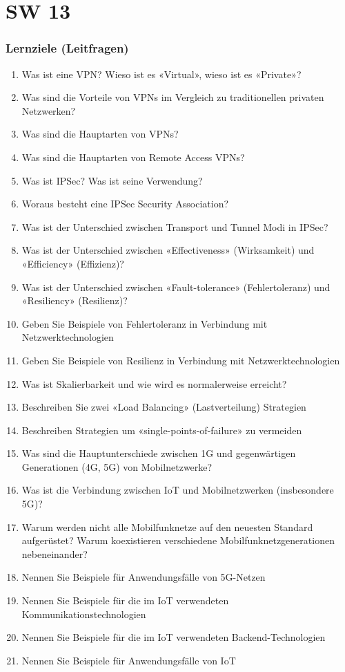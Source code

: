 \part{SW 13}
\section{Lernziele (Leitfragen)}
\begin{enumerate}
    \item Was ist eine VPN? Wieso ist es «Virtual», wieso ist es «Private»?
    \item Was sind die Vorteile von VPNs im Vergleich zu traditionellen privaten Netzwerken?
    \item Was sind die Hauptarten von VPNs?
    \item Was sind die Hauptarten von Remote Access VPNs?
    \item Was ist IPSec? Was ist seine Verwendung?
    \item Woraus besteht eine IPSec Security Association?
    \item Was ist der Unterschied zwischen Transport und Tunnel Modi in IPSec?
    \item Was ist der Unterschied zwischen «Effectiveness» (Wirksamkeit) und «Efficiency» (Effizienz)?
    \item Was ist der Unterschied zwischen «Fault-tolerance» (Fehlertoleranz) und «Resiliency» (Resilienz)?
    \item Geben Sie Beispiele von Fehlertoleranz in Verbindung mit Netzwerktechnologien
    \item Geben Sie Beispiele von Resilienz in Verbindung mit Netzwerktechnologien
    \item Was ist Skalierbarkeit und wie wird es normalerweise erreicht?
    \item Beschreiben Sie zwei «Load Balancing» (Lastverteilung) Strategien
    \item Beschreiben Strategien um «single-points-of-failure» zu vermeiden
    \item Was sind die Hauptunterschiede zwischen 1G und gegenwärtigen Generationen (4G, 5G) von Mobilnetzwerke?
    \item Was ist die Verbindung zwischen IoT und Mobilnetzwerken (insbesondere 5G)?
    \item Warum werden nicht alle Mobilfunknetze auf den neuesten Standard aufgerüstet? Warum koexistieren verschiedene Mobilfunknetzgenerationen nebeneinander?
    \item Nennen Sie Beispiele für Anwendungsfälle von 5G-Netzen
    \item Nennen Sie Beispiele für die im IoT verwendeten Kommunikationstechnologien
    \item Nennen Sie Beispiele für die im IoT verwendeten Backend-Technologien
    \item Nennen Sie Beispiele für Anwendungsfälle von IoT
\end{enumerate}

